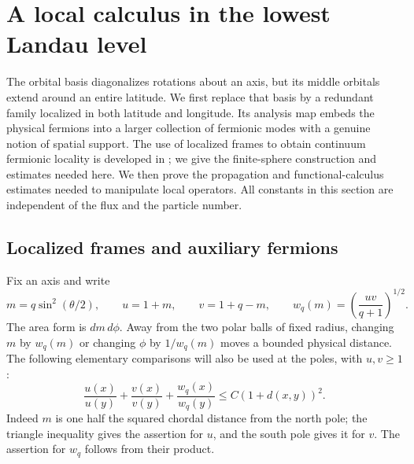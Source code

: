 \section{A local calculus in the lowest Landau level}
\label{sec:locality}

The orbital basis diagonalizes rotations about an axis, but its middle
orbitals extend around an entire latitude.  We first replace that basis by
a redundant family localized in both latitude and longitude.  Its analysis
map embeds the physical fermions into a larger collection of fermionic
modes with a genuine notion of spatial support.  The use of localized
frames to obtain continuum fermionic locality is developed in
\cite{BDN}; we give the finite-sphere construction and estimates needed
here.  We then prove the
propagation and functional-calculus estimates needed to manipulate local
operators.  All constants in this section are independent of the flux and
the particle number.

\subsection{Localized frames and auxiliary fermions}

Fix an axis and write
\begin{equation}
 m=q\sin^2(\theta/2),\qquad u=1+m,\qquad v=1+q-m,
 \qquad w_q(m)=\left(\frac{uv}{q+1}\right)^{1/2}.
 \label{eq:local-scales}
\end{equation}
The area form is $dm\,d\phi$.  Away from the two polar balls of fixed
radius, changing $m$ by $w_q(m)$ or changing $\phi$ by $1/w_q(m)$ moves a
bounded physical distance.  The following elementary comparisons will
also be used at the poles, with $u,v\geq1$:
\begin{equation}
 \frac{u(x)}{u(y)}+\frac{v(x)}{v(y)}
 +\frac{w_q(x)}{w_q(y)}
 \leq C(1+d(x,y))^2.
 \label{eq:local-scale-ratios}
\end{equation}
Indeed $m$ is one half the squared chordal distance from the north pole;
the triangle inequality gives the assertion for $u$, and the south pole
gives it for $v$.  The assertion for $w_q$ follows from their product.

